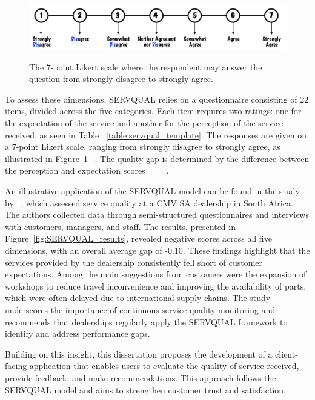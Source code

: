 \begin{figure}[h]
  \caption{The 7-point Likert scale where the respondent may answer the question from strongly disagree to strongly agree. ~\cite{master_servqual_model}}
  \centering
  \includegraphics[width=\textwidth]{figs/likert_scale}
  \label{fig:likert_scale}
\end{figure}


To assess these dimensions, SERVQUAL relies on a questionnaire consisting of 22 items, divided across the five categories. Each item requires two ratings: one for the expectation of the service and another for the perception of the service received, as seen in Table ~\ref{table:servqual_template}. The responses are given on a 7-point Likert scale, ranging from strongly disagree to strongly agree, as illustrated in Figure~\ref{fig:likert_scale} ~\cite{Measuring_After_sales_Service_Quality}. The quality gap is determined by the difference between the perception and expectation scores ~\cite{servqual_blog_da_qualidade} ~\cite{Measuring_After_sales_Service_Quality} ~\cite{SERVQUAL_OLD}.

An illustrative application of the SERVQUAL model can be found in the study by ~\citet{Measuring_After_sales_Service_Quality}, which assessed service quality at a CMV SA dealership in South Africa. The authors collected data through semi-structured questionnaires and interviews with customers, managers, and staff. The results, presented in Figure~\ref{fig:SERVQUAL_results}, revealed negative scores across all five dimensions, with an overall average gap of -0.10. These findings highlight that the services provided by the dealership consistently fell short of customer expectations. Among the main suggestions from customers were the expansion of workshops to reduce travel inconvenience and improving the availability of parts, which were often delayed due to international supply chains. The study underscores the importance of continuous service quality monitoring and recommends that dealerships regularly apply the SERVQUAL framework to identify and address performance gaps.

Building on this insight, this dissertation proposes the development of a client-facing application that enables users to evaluate the quality of service received, provide feedback, and make recommendations. This approach follows the SERVQUAL model and aims to strengthen customer trust and satisfaction.



